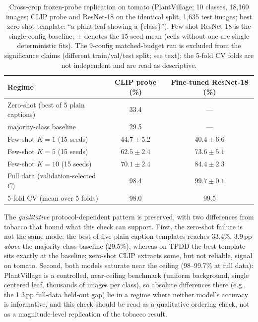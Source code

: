 \documentclass[10pt,a4paper]{article}
\begin{document}
\begin{table}[!ht]
\centering
\caption{Cross-crop frozen-probe replication on tomato (PlantVillage; 10 classes, 18{,}160 images; CLIP probe and ResNet-18 on the identical split, 1{,}635 test images; best zero-shot template: ``a plant leaf showing a \{class\}''). Few-shot ResNet-18 is the single-config baseline; $\pm$ denotes the 15-seed mean (cells without one are single deterministic fits). The 9-config matched-budget run is excluded from the significance claims (different train/val/test split; see text); the 5-fold CV folds are not independent and are read as descriptive.}
\label{tab:tomato}
\begin{tabular}{lcc}
\toprule
\textbf{Regime} & \textbf{CLIP probe (\%)} & \textbf{Fine-tuned ResNet-18 (\%)} \\
\midrule
Zero-shot (best of 5 plain captions) & 33.4 & --- \\
\quad majority-class baseline       & 29.5 & --- \\
Few-shot $K{=}1$  (15 seeds) & $44.7\pm5.2$ & $40.4\pm6.6$ \\
Few-shot $K{=}5$  (15 seeds) & $62.5\pm2.4$ & $73.6\pm5.1$ \\
Few-shot $K{=}10$ (15 seeds) & $70.1\pm2.4$ & $84.4\pm2.3$ \\
Full data (validation-selected $C$) & 98.4 & $99.7\pm0.1$ \\
5-fold CV (mean over 5 folds) & 98.0 & 99.5 \\
\bottomrule
\end{tabular}
\end{table}

The \emph{qualitative} protocol-dependent pattern is preserved, with two differences from tobacco that bound what this check can support. First, the zero-shot failure is not the same mode: the best of five plain caption templates reaches 33.4\%, 3.9\,pp \emph{above} the majority-class baseline (29.5\%), whereas on TPDD the best template sits exactly at the baseline; zero-shot CLIP extracts some, but not reliable, signal on tomato. Second, both models saturate near the ceiling (98--99.7\% at full data): PlantVillage is a controlled, near-ceiling benchmark (uniform background, single centered leaf, thousands of images per class), so absolute differences there (e.g., the 1.3\,pp full-data held-out gap) lie in a regime where neither model's accuracy is informative, and this check should be read as a qualitative ordering check, not as a magnitude-level replication of the tobacco result.
\end{document}
